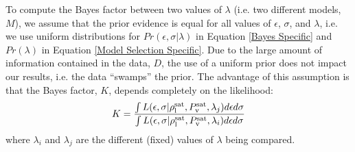 \documentclass[journal=jctc,manuscript=article]{achemso}
\begin{document}
%

To compute the Bayes factor between two values of $\lambda$ 
(i.e. two different models, $M$), we assume that the prior evidence is equal for all values of $\epsilon$, $\sigma$, and $\lambda$, i.e. we use uniform distributions for $Pr(\epsilon,\sigma|\lambda)$ in Equation \ref{Bayes Specific} and $Pr(\lambda)$ in Equation \ref{Model Selection Specific}. Due to the large amount of information contained in the data, $D$, the use of a uniform prior does not impact our results, i.e. the data ``swamps'' the prior.
The advantage of this assumption is that the Bayes factor, $K$, depends completely on the likelihood:
\begin{equation} \label{Bayes Factor}
K = \frac{ \int L(\epsilon,\sigma|\rho_{\rm l}^{\rm sat},P_{\rm v}^{\rm sat},\lambda_j) d\epsilon d\sigma}{ \int L(\epsilon,\sigma|\rho_{\rm l}^{\rm sat},P_{\rm v}^{\rm sat},\lambda_i) d\epsilon d\sigma}
\end{equation}
where $\lambda_i$ and $\lambda_j$ are the different (fixed) values of $\lambda$ being compared.
\end{document}
